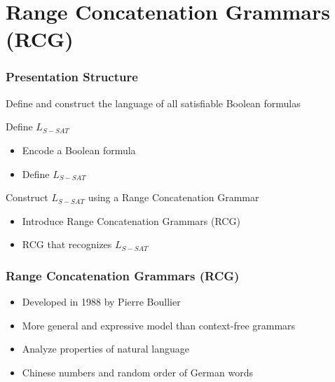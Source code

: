 \documentclass{beamer}
\begin{document}
\section{Range Concatenation Grammars (RCG)}

\begin{frame}
    \frametitle{Presentation Structure}

    Define and construct the language of all satisfiable Boolean formulas


    \begin{block}{Define $L_{S-SAT}$}
        \begin{itemize}
            \item Encode a Boolean formula
            \item Define $L_{S-SAT}$
        \end{itemize}
    \end{block}


    \begin{block}{Construct $L_{S-SAT}$ using a Range Concatenation Grammar}
        \begin{itemize}
            \item Introduce Range Concatenation Grammars (RCG)
            \item RCG that recognizes $L_{S-SAT}$
        \end{itemize}
    \end{block}
\end{frame}

\begin{frame}
    \frametitle{Range Concatenation Grammars (RCG)}

    \begin{itemize}
        \item Developed in 1988 by Pierre Boullier
              \pause
        \item More general and expressive model than context-free grammars
              \pause
        \item Analyze properties of natural language
              \pause
        \item Chinese numbers and random order of German words
    \end{itemize}
\end{frame}
\end{document}

